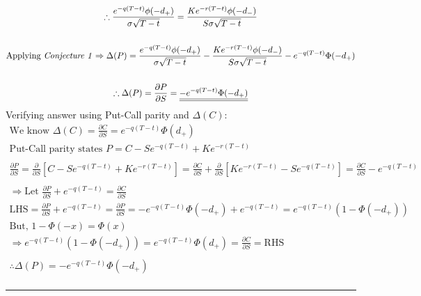 \documentclass[letterpaper,10pt]{article}
\newcommand{\doubleu}[1]{\underline{\underline{#1}}}
\newcommand{\partiald}[2]{\frac{\partial #1}{\partial #2}}
\begin{document}
\begin{gather*}
				\therefore \frac{e^{-q(T-t)} \phi(-d_{+})}{\sigma \sqrt{T-t}} = \frac{Ke^{-r(T-t)}\phi(-d_{-})}{S \sigma \sqrt{T-t}} \\
				\\
				\text{Applying \textit{Conjecture 1}} \Rightarrow \Delta(P) = \frac{e^{-q(T-t)} \phi(-d_{+})}{\sigma \sqrt{T-t}} - \frac{K e^{-r(T-t)} \phi(-d_{-})}{S\sigma\sqrt{T-t}} - e^{-q(T-t)} \Phi(-d_{+}) \\
				\\
				\therefore \Delta(P) = \partiald{P}{S} = \doubleu{-e^{-q(T-t)} \Phi(-d_+)}
				\\
			\end{gather*}
			Verifying answer using Put-Call parity and $\Delta(C)$:
			\begin{gather*}
				\text{We know } \Delta(C) = \partiald{C}{S} = e^{-q(T-t)} \Phi(d_+) \\
				\text{Put-Call parity states } P = C - Se^{-q(T-t)} + Ke^{-r(T-t)} \\
				\\
				\partiald{P}{S} = \partiald{}{S}\left[ C - Se^{-q(T-t)} + Ke^{-r(T-t)} \right] = \partiald{C}{S} + \partiald{}{S}\left[Ke^{-r(T-t)} - Se^{-q(T-t)} \right] = \partiald{C}{S} - e^{-q(T-t)} \\
				\\
				\Rightarrow \text{Let } \partiald{P}{S} + e^{-q(T-t)} = \partiald{C}{S} \\
				\text{LHS} = \partiald{P}{S} + e^{-q(T-t)} = \partiald{P}{S} = -e^{-q(T-t)} \Phi(-d_+) + e^{-q(T-t)} = e^{-q(T-t)} (1-\Phi(-d_+)) \\
				\text{But, } 1-\Phi(-x) = \Phi(x) \\
				\Rightarrow e^{-q(T-t)} (1-\Phi(-d_+)) = e^{-q(T-t)} \Phi(d_+) = \partiald{C}{S} = \text{RHS} \\
				\\
				\boxed{\therefore \Delta(P) = -e^{-q(T-t)} \Phi(-d_+)}
				\\
			\end{gather*}

		\hrule
\end{document}
